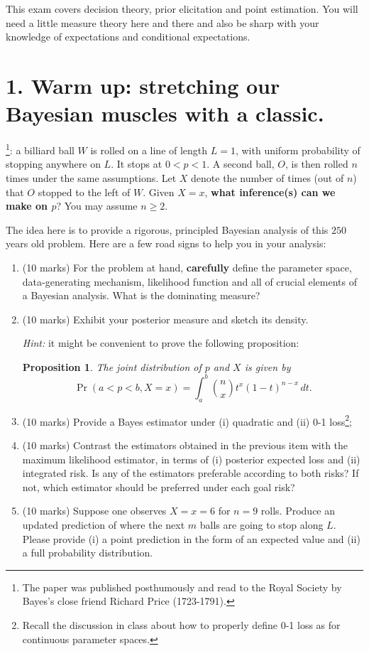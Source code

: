 \documentclass[a4paper,10pt, notitlepage]{report}
\newtheorem{proposition}[thm]{Proposition}
\newcommand{\pr}{\operatorname{Pr}} %
\begin{document}
This exam covers decision theory, prior elicitation and  point estimation.
You will need a little measure theory here and there and also be sharp with your knowledge of expectations and conditional expectations.

\section*{1. Warm up: stretching our Bayesian muscles with a classic.}

\cite{Bayes1763}\footnote{The paper was published posthumously and read to the Royal Society by Bayes's close friend Richard Price (1723-1791).}: a billiard ball $W$ is rolled on a line of length $L = 1$, with uniform probability of stopping anywhere on $L$. 
It stops at $0 < p < 1$.
A second ball, $O$, is then rolled $n$ times under the same assumptions.
Let $X$ denote the number of times (out of $n$) that $O$ stopped to the left of $W$.
Given $X=x$, \textbf{what inference(s) can we make on $p$}?
You may assume $n\geq2$.

The idea here is to provide a rigorous, principled Bayesian analysis of this $250$ years old problem.
Here are a few road signs to help you in your analysis:
\begin{enumerate}[label=\alph*)]
 \item (10 marks) For the problem at hand, \textbf{carefully} define the parameter space, data-generating mechanism, likelihood function and all of crucial elements of a Bayesian analysis. What is the dominating measure?
 \item (10 marks) Exhibit your posterior measure and sketch its density.
 
 \textit{Hint:} it might be convenient to prove the following proposition:
 \begin{proposition}
 \label{prop:joint_bayes}
 The joint distribution of $p$ and $X$ is given by
 \begin{equation*}
  \pr(a < p < b, X = x) = \int_{a}^{b} \binom{n}{x} t^x(1-t)^{n-x}\,dt.
 \end{equation*}
 \end{proposition}
 \item (10 marks) Provide a Bayes estimator under (i) quadratic and (ii) 0-1 loss\footnote{Recall the discussion in class about how to properly define 0-1 loss as for continuous parameter spaces.};
 \item (10 marks) Contrast the estimators obtained in the previous item  with the maximum likelihood estimator, in terms of (i) posterior expected loss and (ii) integrated risk.
 Is any of the estimators preferable according to both risks?
 If not, which estimator should be preferred under each goal risk?
 \item (10 marks) Suppose one observes $X = x = 6$ for $n=9$ rolls.
 Produce an updated prediction of where the next $m$ balls are going to stop along $L$.
 Please provide (i) a point prediction in the form of an expected value and (ii) a full probability distribution.
\end{enumerate}
\end{document}
